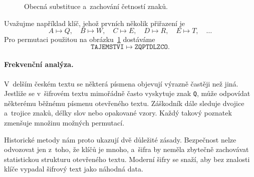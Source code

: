 \begin{figure}[ht]
    \centering
    
    \caption{Obecná substituce a~zachování četností znaků.}
    \label{fig:krypto-substituce}
\end{figure}

Uvažujme například klíč, jehož prvních několik přiřazení je
\[
    A\mapsto Q,\quad B\mapsto W,\quad C\mapsto E,\quad
    D\mapsto R,\quad E\mapsto T,\quad\ldots
\]
Pro permutaci použitou na obrázku~\ref{fig:krypto-substituce} dostáváme
\[
    \texttt{TAJEMSTVI}\longmapsto\texttt{ZQPTDLZCO}.
\]


\paragraph{Frekvenční analýza.}

V~delším českém textu se některá písmena objevují výrazně častěji než jiná. Jestliže se v~šifrovém textu mimořádně často vyskytuje znak \texttt{Q}, může odpovídat některému běžnému písmenu otevřeného textu. Záškodník dále sleduje dvojice a~trojice znaků, délky slov nebo opakované vzory. Každý takový poznatek zmenšuje množinu možných permutací.

Historické metody nám proto ukazují dvě důležité zásady. Bezpečnost nelze odvozovat jen z~toho, že klíčů je mnoho, a~šifra by neměla zbytečně zachovávat statistickou strukturu otevřeného textu. Moderní šifry se snaží, aby bez znalosti klíče vypadal šifrový text jako náhodná data.
